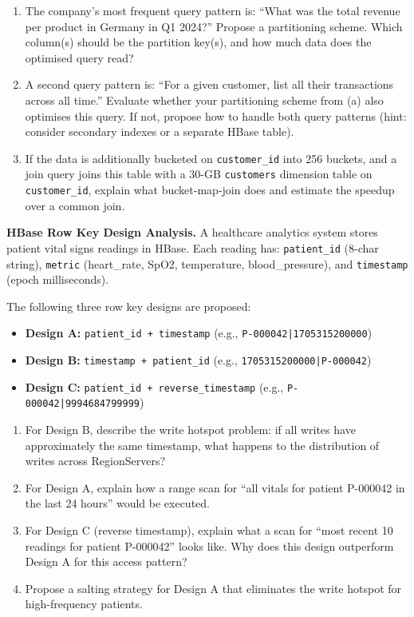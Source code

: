 \begin{enumerate}[label=(\alph*)]
  \item The company's most frequent query pattern is:
        ``What was the total revenue per product in Germany in Q1 2024?''
        Propose a partitioning scheme. Which column(s) should be the
        partition key(s), and how much data does the optimised query read?
  \item A second query pattern is: ``For a given customer, list all
        their transactions across all time.'' Evaluate whether your
        partitioning scheme from (a) also optimises this query.
        If not, propose how to handle both query patterns (hint:
        consider secondary indexes or a separate HBase table).
  \item If the data is additionally bucketed on \texttt{customer\_id}
        into 256 buckets, and a join query joins this table with a
        30-GB \texttt{customers} dimension table on \texttt{customer\_id},
        explain what bucket-map-join does and estimate the speedup
        over a common join.
\end{enumerate}

\ap \textbf{HBase Row Key Design Analysis.}
A healthcare analytics system stores patient vital signs readings in
HBase. Each reading has: \texttt{patient\_id} (8-char string),
\texttt{metric} (heart\_rate, SpO2, temperature, blood\_pressure),
and \texttt{timestamp} (epoch milliseconds).

The following three row key designs are proposed:

\begin{itemize}
  \item \textbf{Design A:} \texttt{patient\_id + timestamp}
        (e.g., \texttt{P-000042|1705315200000})
  \item \textbf{Design B:} \texttt{timestamp + patient\_id}
        (e.g., \texttt{1705315200000|P-000042})
  \item \textbf{Design C:} \texttt{patient\_id + reverse\_timestamp}
        (e.g., \texttt{P-000042|9994684799999})
\end{itemize}

\begin{enumerate}[label=(\alph*)]
  \item For Design B, describe the write hotspot problem: if all
        writes have approximately the same timestamp, what happens to
        the distribution of writes across RegionServers?
  \item For Design A, explain how a range scan for ``all vitals for
        patient P-000042 in the last 24 hours'' would be executed.
  \item For Design C (reverse timestamp), explain what a scan for
        ``most recent 10 readings for patient P-000042'' looks like.
        Why does this design outperform Design A for this access pattern?
  \item Propose a salting strategy for Design A that eliminates the
        write hotspot for high-frequency patients.
\end{enumerate}


